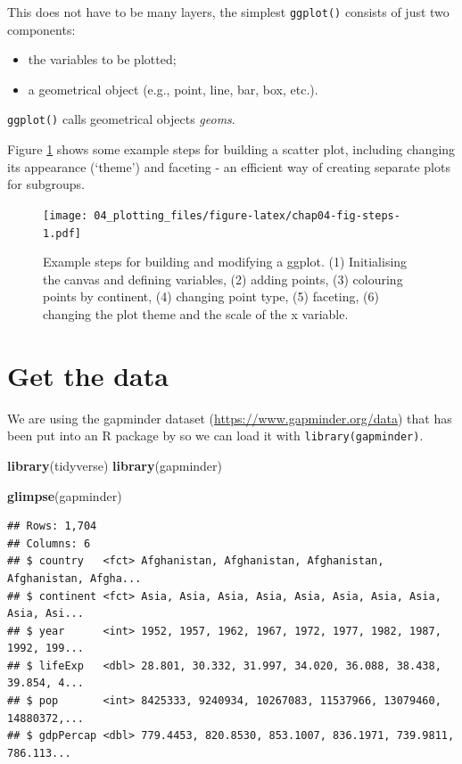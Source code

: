 \documentclass[
  12pt,
  krantz2]{krantz}
\makeatletter
\newenvironment{Shaded}{\begin{snugshade}}{\end{snugshade}}
\newcommand{\KeywordTok}[1]{\textcolor[rgb]{0.13,0.29,0.53}{\textbf{#1}}}
\newcommand{\NormalTok}[1]{#1}
\providecommand{\tightlist}{%
  \setlength{\itemsep}{0pt}\setlength{\parskip}{0pt}}
\newenvironment{kframe}{%
\medskip{}
\setlength{\fboxsep}{.8em}
 \def\at@end@of@kframe{}%
 \ifinner\ifhmode%
  \def\at@end@of@kframe{\end{minipage}}%
  \begin{minipage}{\columnwidth}%
 \fi\fi%
 \def\FrameCommand##1{\hskip\@totalleftmargin \hskip-\fboxsep
 \colorbox{shadecolor}{##1}\hskip-\fboxsep
     \hskip-\linewidth \hskip-\@totalleftmargin \hskip\columnwidth}%
 \MakeFramed {\advance\hsize-\width
   \@totalleftmargin\z@ \linewidth\hsize
   \@setminipage}}%
 {\par\unskip\endMakeFramed%
 \at@end@of@kframe}
\renewenvironment{Shaded}{\begin{kframe}}{\end{kframe}}
\makeatother
\begin{document}
This does not have to be many layers, the simplest \texttt{ggplot()} consists of just two components:

\begin{itemize}
\tightlist
\item
  the variables to be plotted;
\item
  a geometrical object (e.g., point, line, bar, box, etc.).
\end{itemize}

\texttt{ggplot()} calls geometrical objects \emph{geoms}.

Figure \ref{fig:chap04-fig-steps} shows some example steps for building a scatter plot, including changing its appearance (`theme') and faceting - an efficient way of creating separate plots for subgroups.


\begin{figure}
\centering
\texttt{[image: 04\_plotting\_files/figure-latex/chap04-fig-steps-1.pdf]}
\caption{\label{fig:chap04-fig-steps}Example steps for building and modifying a ggplot. (1) Initialising the canvas and defining variables, (2) adding points, (3) colouring points by continent, (4) changing point type, (5) faceting, (6) changing the plot theme and the scale of the x variable.}
\end{figure}

\clearpage

\hypertarget{chap04-data}{%
\section{Get the data}\label{chap04-data}}

We are using the gapminder dataset (\url{https://www.gapminder.org/data}) that has been put into an R package by \citet{bryan2017} so we can load it with \texttt{library(gapminder)}.

\begin{Shaded}
\begin{Highlighting}[]
\KeywordTok{library}\NormalTok{(tidyverse)}
\KeywordTok{library}\NormalTok{(gapminder)}

\KeywordTok{glimpse}\NormalTok{(gapminder)}
\end{Highlighting}
\end{Shaded}

\begin{verbatim}
## Rows: 1,704
## Columns: 6
## $ country   <fct> Afghanistan, Afghanistan, Afghanistan, Afghanistan, Afgha...
## $ continent <fct> Asia, Asia, Asia, Asia, Asia, Asia, Asia, Asia, Asia, Asi...
## $ year      <int> 1952, 1957, 1962, 1967, 1972, 1977, 1982, 1987, 1992, 199...
## $ lifeExp   <dbl> 28.801, 30.332, 31.997, 34.020, 36.088, 38.438, 39.854, 4...
## $ pop       <int> 8425333, 9240934, 10267083, 11537966, 13079460, 14880372,...
## $ gdpPercap <dbl> 779.4453, 820.8530, 853.1007, 836.1971, 739.9811, 786.113...
\end{verbatim}
\end{document}
